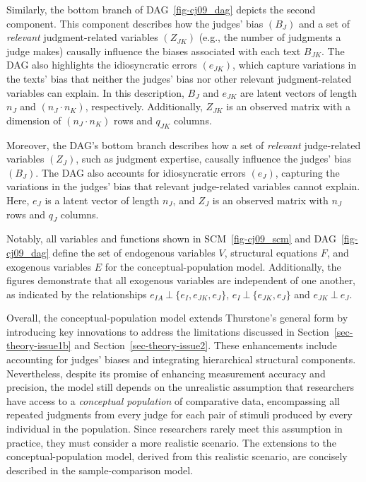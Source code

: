 \documentclass[
  authoryear,
  review,
  1p]{elsarticle}
\begin{document}
Similarly, the bottom branch of DAG~\ref{fig-cj09_dag} depicts the
second component. This component describes how the judges' bias
\((B_{J})\) and a set of \emph{relevant} judgment-related variables
\((Z_{JK})\) (e.g., the number of judgments a judge makes) causally
influence the biases associated with each text \(B_{JK}\). The DAG also
highlights the idiosyncratic errors \((e_{JK})\), which capture
variations in the texts' bias that neither the judges' bias nor other
relevant judgment-related variables can explain. In this description,
\(B_{J}\) and \(e_{JK}\) are latent vectors of length \(n_{J}\) and
\((n_{J} \cdot n_{K})\), respectively. Additionally, \(Z_{JK}\) is an
observed matrix with a dimension of \((n_{J} \cdot n_{K})\) rows and
\(q_{JK}\) columns.

Moreover, the DAG's bottom branch describes how a set of \emph{relevant}
judge-related variables \((Z_{J})\), such as judgment expertise,
causally influence the judges' bias \((B_{J})\). The DAG also accounts
for idiosyncratic errors \((e_{J})\), capturing the variations in the
judges' bias that relevant judge-related variables cannot explain. Here,
\(e_{J}\) is a latent vector of length \(n_{J}\), and \(Z_{J}\) is an
observed matrix with \(n_{J}\) rows and \(q_{J}\) columns.

Notably, all variables and functions shown in SCM~\ref{fig-cj09_scm} and
DAG~\ref{fig-cj09_dag} define the set of endogenous variables \(V\),
structural equations \(F\), and exogenous variables \(E\) for the
conceptual-population model. Additionally, the figures demonstrate that
all exogenous variables are independent of one another, as indicated by
the relationships \(e_{IA} \:\bot\:\{ e_{I}, e_{JK}, e_{J} \}\),
\(e_{I} \:\bot\:\{ e_{JK}, e_{J} \}\) and \(e_{JK} \:\bot\:e_{J}\).

Overall, the conceptual-population model extends Thurstone's general
form by introducing key innovations to address the limitations discussed
in Section~\ref{sec-theory-issue1b} and Section~\ref{sec-theory-issue2}.
These enhancements include accounting for judges' biases and integrating
hierarchical structural components. Nevertheless, despite its promise of
enhancing measurement accuracy and precision, the model still depends on
the unrealistic assumption that researchers have access to a
\emph{conceptual population} of comparative data, encompassing all
repeated judgments from every judge for each pair of stimuli produced by
every individual in the population. Since researchers rarely meet this
assumption in practice, they must consider a more realistic scenario.
The extensions to the conceptual-population model, derived from this
realistic scenario, are concisely described in the sample-comparison
model.
\end{document}
